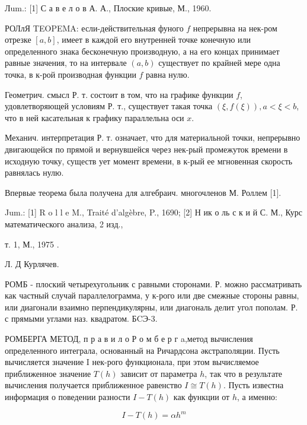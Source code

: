 \documentclass[10pt]{article}
\begin{document}
Лum.: [1] С а в е л о в А. А., Плоские кривые, М., 1960.



РОЛлЯ TEOPEMA: если-действительная фуного $f$ непрерывна на нек-ром отрезке $[a, b]$, имеет в каждой его внутренней точке конечную или определенного знака бесконечную производную, а на его концах принимает равные значения, то на интервале $(a, b)$ существует по крайней мере одна точка, в к-рой производная функции $f$ равна нулю.



Геометрич. смысл Р. т. состоит в том, что на графике функции $f$, удовлетворяющей условиям Р. т., существует такая точка $(\xi, f(\xi)), a<\xi<b$, что в ней касательная к графику параллельна оси $x$.



Механич. интерпретация Р. т. означает, что для материальной точки, непрерывно двигающейся по прямой и вернувшейся через нек-рый промежуток времени в исходную точку, существ ует момент времени, в к-рый ее мгновенная скорость равнялась нулю.



Впервые теорема была получена для алгебраич. многочленов М. Роллем [1].



Jum.: [1] R o l l e M., Traité d'algèbre, P., 1690; [2] Н ик о ль с к и й С. М., Курс математического анализа, 2 изд.,

т. 1, М., 1975 .

Л. Д Курлячев.



РОМБ - плоский четырехугольник с равными сторонами. Р. можно рассматривать как частный случай параллелограмма, у к-рого или две смежные стороны равны, или диагонали взаимно перпендикулярны, или диагональ делит угол пополам. Р. с прямыми углами наз. квадратом. БCЭ-3.



РОМБЕРГА МЕТОД, п р а в и л о Р о м б е р г a,метод вычисления определенного интеграла, основанный на Ричардсона әкстраполяции. Пусть вычисляется значение I нек-рого функционала, при этом вычисляемое приближенное значение $T(h)$ зависит от параметра $h$, так что в результате вычисления получается приближенное равенство $I \cong T(h)$. Пусть известна информация о поведении разности $I-T(h)$ как функции от $h$, а именно:



\[

I-T(h)=\alpha h^{m}

\]
\end{document}
